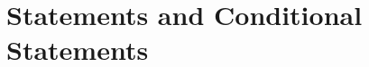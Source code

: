 \section{Statements and Conditional Statements}\label{S:prop}       
\setcounter{previewactivity}{0}

















 

\endinput


